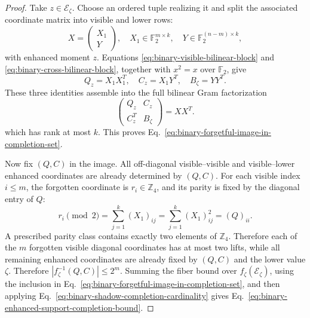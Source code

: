 \documentclass[11pt]{article}
\newcommand{\F}{\mathbb F}
\newcommand{\1}{\mathbf 1}
\theoremstyle{plain}
\theoremstyle{definition}
\theoremstyle{remark}
\begin{document}
\begin{proof}
Take $z\in\mathcal E_\zeta$.  Choose an ordered tuple realizing it and split
the associated coordinate matrix into visible and lower rows:
\begin{equation}
 X=\begin{pmatrix}X_1\\Y\end{pmatrix},
 \quad
 X_1\in\F_2^{m\times k},
 \quad Y\in\F_2^{(n-m)\times k},
 \label{eq:binary-realizing-tuple-blocks}
\end{equation}
with enhanced moment $z$.  Equations
\eqref{eq:binary-visible-bilinear-block} and
\eqref{eq:binary-cross-bilinear-block}, together with $x^2=x$ over
$\F_2$, give
\begin{equation}
 Q_z=X_1X_1^T,
 \quad C_z=X_1Y^T,
 \quad B_\zeta=YY^T.
 \label{eq:binary-realized-bilinear-blocks}
\end{equation}
These three identities assemble into the full bilinear Gram factorization
\begin{equation}
 \begin{pmatrix}Q_z&C_z\\C_z^T&B_\zeta\end{pmatrix}
 =XX^T.
 \label{eq:binary-shadow-full-Gram-factorization}
\end{equation}
which has rank at most $k$.  This proves
Eq.~\eqref{eq:binary-forgetful-image-in-completion-set}.

Now fix $(Q,C)$ in the image.  All off-diagonal visible--visible and
visible--lower enhanced coordinates are already determined by $(Q,C)$.
For each visible index $i\le m$, the forgotten coordinate is
$r_i\in\mathbb Z_4$, and its parity is fixed by the diagonal entry of $Q$:
\begin{equation}
 r_i\pmod2
 =\sum_{j=1}^k(X_1)_{ij}
 =\sum_{j=1}^k(X_1)_{ij}^2
 =(Q)_{ii}.
 \label{eq:binary-enhanced-diagonal-parity}
\end{equation}
A prescribed parity class contains exactly two elements of $\mathbb Z_4$.
Therefore each of the $m$ forgotten visible diagonal coordinates has at most
two lifts, while all remaining enhanced coordinates are already fixed by
$(Q,C)$ and the lower value $\zeta$.  Therefore
$|f_\zeta^{-1}(Q,C)|\le2^m$.  Summing the fiber bound over
$f_\zeta(\mathcal E_\zeta)$, using the inclusion in
Eq.~\eqref{eq:binary-forgetful-image-in-completion-set}, and then applying
Eq.~\eqref{eq:binary-shadow-completion-cardinality} gives
Eq.~\eqref{eq:binary-enhanced-support-completion-bound}.
\end{proof}
\end{document}
